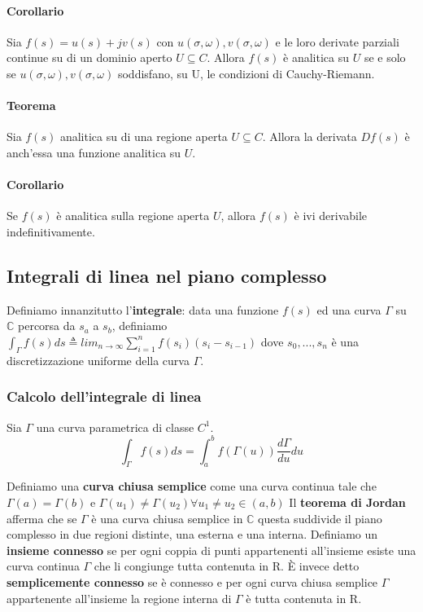\documentclass[11pt]{article}
\begin{document}
\paragraph{Corollario}
Sia $f(s) = u(s) + jv(s)$ con $u(\sigma, \omega), v(\sigma, \omega)$ e le loro derivate parziali continue su di un dominio aperto $U \subseteq C$. Allora $f(s)$ è analitica su $U$ se e solo se $u(\sigma, \omega), v(\sigma, \omega)$ soddisfano, su U, le condizioni di Cauchy-Riemann. 
\paragraph{Teorema} 
Sia $f(s)$ analitica su di una regione aperta $U \subseteq C$. Allora la derivata $Df(s)$ è anch'essa una funzione analitica su $U$.
\paragraph{Corollario}
Se $f(s)$ è analitica sulla regione aperta $U$, allora $f(s)$ è ivi derivabile indefinitivamente.
\subsection{Integrali di linea nel piano complesso}
Definiamo innanzitutto l'\textbf{integrale}: data una funzione $f(s)$ ed una curva $\Gamma$ su $\mathbb{C}$ percorsa da $s_a$ a $s_b$, definiamo $\int_\Gamma f(s) ds \triangleq lim_{n\rightarrow \infty} \sum_{i=1}^n f(s_i)(s_i- s_{i-1})$ dove $s_0,...,s_n$ è una discretizzazione uniforme della curva $\Gamma$. 
\subsubsection{Calcolo dell'integrale di linea}
Sia $\Gamma$ una curva parametrica di classe $C^1$.
\begin{displaymath}
    \int_\Gamma f(s) ds = \int_a^b f\left(\Gamma(u) \right) \frac{d\Gamma}{du} du
\end{displaymath}

Definiamo una \textbf{curva chiusa semplice} come una curva continua tale che $\Gamma(a)=\Gamma(b)$ e $\Gamma(u_1) \neq \Gamma(u_2) \forall u_1 \neq u_2 \in (a,b)$
Il \textbf{teorema di Jordan} afferma che se $\Gamma$ è una curva chiusa semplice in $\mathbb{C}$ questa suddivide il piano complesso in due regioni distinte, una esterna e una interna. 
Definiamo un \textbf{insieme connesso} se per ogni coppia di punti appartenenti all'insieme esiste una curva continua $\Gamma$ che li congiunge tutta contenuta in R. È invece detto \textbf{semplicemente connesso} se è connesso e per ogni curva chiusa semplice $\Gamma$ appartenente all'insieme la regione interna di $\Gamma$ è tutta contenuta in R.
\end{document}
